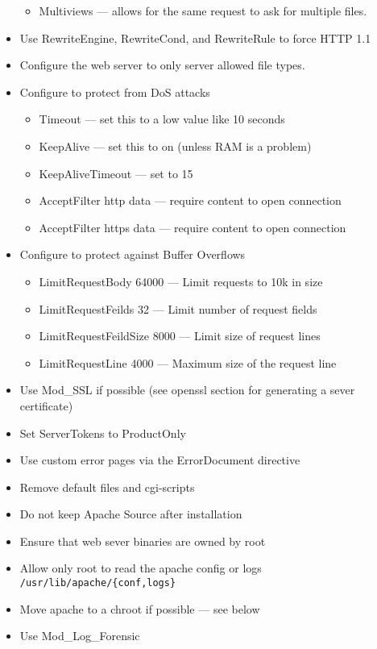\begin{itemize}
\begin{itemize}
			\item Multiviews --- allows for the same request to ask for multiple files.
		\end{itemize}
	\item Use RewriteEngine, RewriteCond, and RewriteRule to force HTTP 1.1
	\item Configure the web server to only server allowed file types.
	\item Configure to protect from DoS attacks
		\begin{itemize}
			\item Timeout --- set this to a low value like 10 seconds
			\item KeepAlive --- set this to on (unless RAM is a problem)
			\item KeepAliveTimeout --- set to 15
			\item AcceptFilter http data --- require content to open connection
			\item AcceptFilter https data --- require content to open connection
		\end{itemize}
	\item Configure to protect against Buffer Overflows
		\begin{itemize}
			\item LimitRequestBody 64000 --- Limit requests to 10k in size
			\item LimitRequestFeilds 32 --- Limit number of request fields
			\item LimitRequestFeildSize 8000 --- Limit size of request lines
			\item LimitRequestLine 4000 --- Maximum size of the request line
		\end{itemize}
	\item Use Mod\_SSL if possible (see openssl section for generating a sever certificate)
	\item Set ServerTokens to ProductOnly
	\item Use custom error pages via the ErrorDocument directive
	\item Remove default files and cgi-scripts
	\item Do not keep Apache Source after installation
	\item Ensure that web sever binaries are owned by root
	\item Allow only root to read the apache config or logs \lstinline|/usr/lib/apache/{conf,logs}|
	\item Move apache to a chroot if possible --- see below
	\item Use Mod\_Log\_Forensic
\end{itemize}


